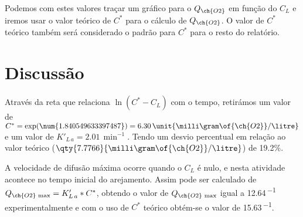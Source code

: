 \documentclass[\mainfilename]{subfiles}
\begin{document}
\begin{sectionBox}
    Podemos com estes valores traçar um gráfico para o \(Q_{\ch{O2}}\) em função do \(C_L\) e iremos usar o valor teórico de \(C^*\) para o cálculo de \(Q_{\ch{O2}}\). O valor de \(C^*\) teórico também será considerado o padrão para \(C^*\) para o resto do relatório.

    \begin{center}
    \end{center}

    
    
    \section*{Discussão}
    Através da reta que relaciona \(\ln(C^*-C_L)\) com o tempo, retirámos um valor de \(C^* = \exp(\num{1.840549633397487}) = 6.30\,\unit{\milli\gram\of{\ch{O2}}/\litre}\) e um valor de \(K'_{L\,a} = 2.01\,\unit{\min^{-1}}\). Tendo um desvio percentual em relação ao valor teórico (\(\qty{7.7766}{\milli\gram\of{\ch{O2}}/\litre}\)) de 19.2\%. 

    A velocidade de difusão máxima ocorre quando o \(C_L\) é nulo, e nesta atividade acontece no tempo inicial do arejamento. Assim pode ser calculado de \(Q_{\ch{O2}\,\max} = K'_{L\,a}*C^*\), obtendo o valor de \(Q_{\ch{O2}\,\max}\) igual a 12.64\,\unit{\min^{-1}} experimentalmente e com o uso de \(C^*\) teórico obtém-se o valor de 15.63\,\unit{\min^{-1}}.

\end{sectionBox} 
\end{document}
